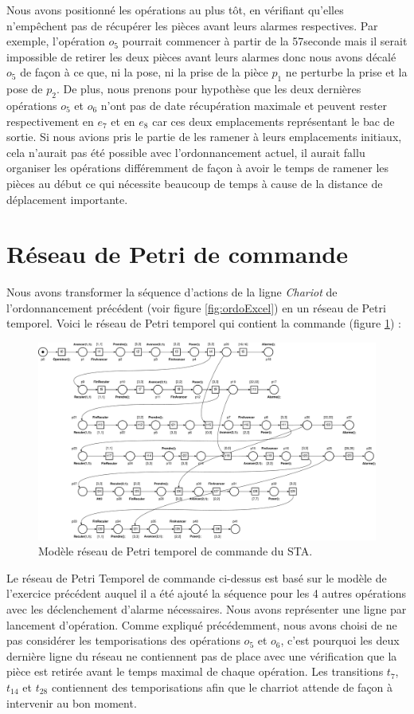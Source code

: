 Nous avons positionné les opérations au plus tôt, en vérifiant qu'elles n'empêchent pas de récupérer les pièces avant leurs alarmes respectives. Par exemple, l'opération $o_5$ pourrait commencer à partir de la 57\ieme seconde mais il serait impossible de retirer les deux pièces avant leurs alarmes donc nous avons décalé $o_5$ de façon à ce que, ni la pose, ni la prise de la pièce $p_1$ ne perturbe la prise et la pose de $p_2$. De plus, nous prenons pour hypothèse que les deux dernières opérations $o_5$ et $o_6$ n'ont pas de date récupération maximale et peuvent rester respectivement en $e_7$ et en $e_8$ car ces deux emplacements représentant le bac de sortie. Si nous avions pris le partie de les ramener à leurs emplacements initiaux, cela n'aurait pas été possible avec l'ordonnancement actuel, il aurait fallu organiser les opérations différemment de façon à avoir le temps de ramener les pièces au début ce qui nécessite beaucoup de temps à cause de la distance de déplacement importante.

\section{Réseau de Petri de commande}
Nous avons transformer la séquence d'actions de la ligne \emph{Chariot} de l'ordonnancement précédent (voir figure \ref{fig:ordoExcel}) en un réseau de Petri temporel. Voici le réseau de Petri temporel qui contient la commande (figure \ref{fig:III-3-rdptCom}) : 
\begin{figure}[!ht]
\centering
\includegraphics[width=\textwidth]{./III/images/reseau_Analyse--III-3.pdf}
\caption{\label{fig:III-3-rdptCom}Modèle réseau de Petri temporel de commande du STA.}
\end{figure}


Le réseau de Petri Temporel de commande ci-dessus est basé sur le modèle de l'exercice précédent auquel il a été ajouté la séquence pour les 4 autres opérations avec les déclenchement d'alarme nécessaires. Nous avons représenter une ligne par lancement d'opération. Comme expliqué précédemment, nous avons choisi de ne pas considérer les temporisations des opérations $o_5$ et $o_6$, c'est pourquoi les deux dernière ligne du réseau ne contiennent pas de place avec une vérification que la pièce est retirée avant le temps maximal de chaque opération. Les transitions $t_7$, $t_{14}$ et $t_{28}$ contiennent des temporisations afin que le charriot attende de façon à intervenir au bon moment. 
